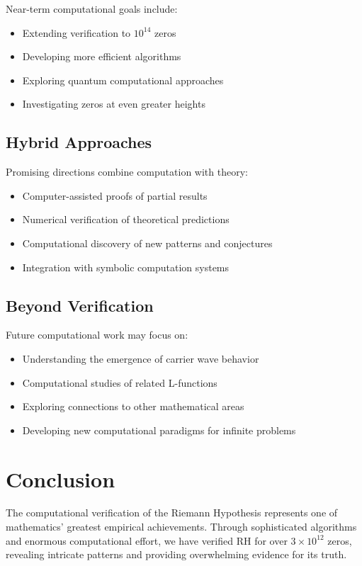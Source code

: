 Near-term computational goals include:
\begin{itemize}
\item Extending verification to $10^{14}$ zeros
\item Developing more efficient algorithms
\item Exploring quantum computational approaches
\item Investigating zeros at even greater heights
\end{itemize}

\subsection{Hybrid Approaches}

Promising directions combine computation with theory:
\begin{itemize}
\item Computer-assisted proofs of partial results
\item Numerical verification of theoretical predictions
\item Computational discovery of new patterns and conjectures
\item Integration with symbolic computation systems
\end{itemize}

\subsection{Beyond Verification}

Future computational work may focus on:
\begin{itemize}
\item Understanding the emergence of carrier wave behavior
\item Computational studies of related L-functions
\item Exploring connections to other mathematical areas
\item Developing new computational paradigms for infinite problems
\end{itemize}

\section{Conclusion}

The computational verification of the Riemann Hypothesis represents one of mathematics' greatest empirical achievements. Through sophisticated algorithms and enormous computational effort, we have verified RH for over $3 \times 10^{12}$ zeros, revealing intricate patterns and providing overwhelming evidence for its truth.

